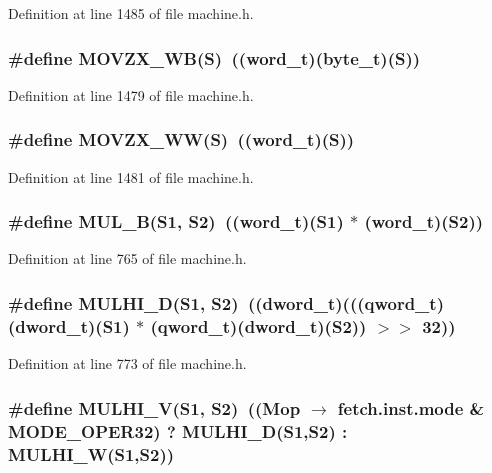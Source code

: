 Definition at line 1485 of file machine.h.
\subsubsection[{MOVZX\_\-WB}]{\setlength{\rightskip}{0pt plus 5cm}\#define MOVZX\_\-WB(S)~(({\bf word\_\-t})({\bf byte\_\-t})(S))}\label{machine_8h_fefeed2f35ef1c2705073c4314ae8f09}




Definition at line 1479 of file machine.h.
\subsubsection[{MOVZX\_\-WW}]{\setlength{\rightskip}{0pt plus 5cm}\#define MOVZX\_\-WW(S)~(({\bf word\_\-t})(S))}\label{machine_8h_b0b5671c5d72d72ce90736707d7d65a3}




Definition at line 1481 of file machine.h.
\subsubsection[{MUL\_\-B}]{\setlength{\rightskip}{0pt plus 5cm}\#define MUL\_\-B(S1, \/  S2)~(({\bf word\_\-t})(S1) $\ast$ ({\bf word\_\-t})(S2))}\label{machine_8h_6fec7301bf6d6bf952aecb94da21d89a}




Definition at line 765 of file machine.h.
\subsubsection[{MULHI\_\-D}]{\setlength{\rightskip}{0pt plus 5cm}\#define MULHI\_\-D(S1, \/  S2)~(({\bf dword\_\-t})(((qword\_\-t)({\bf dword\_\-t})(S1) $\ast$ (qword\_\-t)({\bf dword\_\-t})(S2)) $>$$>$ 32))}\label{machine_8h_5b420e1d4f06a7053f2fc8efed65b9ab}




Definition at line 773 of file machine.h.
\subsubsection[{MULHI\_\-V}]{\setlength{\rightskip}{0pt plus 5cm}\#define MULHI\_\-V(S1, \/  S2)~((Mop $\rightarrow$ fetch.inst.mode \& MODE\_\-OPER32) ? MULHI\_\-D(S1,S2) : MULHI\_\-W(S1,S2))}\label{machine_8h_139034953f61e165993bcfb380683ccc}




